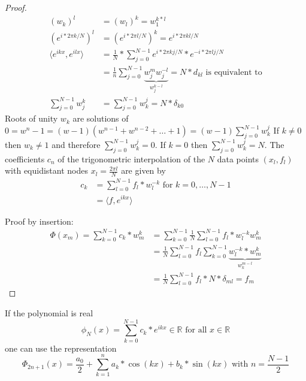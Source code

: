 \begin{proof}
    \begin{align*}
    (w_k)
        ^l &= (w_l)^k = w_1^{k*l}\\
        \left( e^{i*2 \pi k / N} \right)^l &= \left( e^{i*2 \pi l / N} \right)^k = e^{i*2 \pi kl / N}\\
        \langle e^{ikx}, e^{ilx} \rangle &= \frac{1}{N} * \sum_{j=0}^{N-1} e^{i*2 \pi k j / N} * e^{-i*2 \pi l j / N}\\
        &= \frac{1}{n} \sum_{j=0}^{N-1} \underbrace{w_j^m w_j^{-l}}_{w_j^{k-l}} = N * d_{kl} \text{ is equivalent to}\\
        \sum_{j=0}^{N-1}w_j^k &= \sum_{j=0}^{N-1} w_k^{j} = N * \delta_{k0}
    \end{align*}
    Roots of unity $w_k$ are solutions of $0 = w^n-1 = (w-1)(w^{n-1}+w^{n-2}+\ldots+1) = (w-1) \sum_{j=0}^{N-1} w_k^j$
    If $k \neq 0$ then $w_k \neq 1$ and therefore $\sum_{j=0}^{N-1} w_k^j = 0$.
    If $k=0$ then $\sum_{j=0}^{N-1} w_k^j = N$.
    The coefficients $c_n$ of the trigonometric interpolation of the $N$ data points $(x_l, f_l)$ with equidistant nodes $x_l = \frac{2 \pi l}{N}$ are given by
    \begin{align*}
        c_k &= \sum_{l=0}^{N-1} f_l * w_l^{-k} \text{ for } k = 0, \ldots, N-1\\
        &= \langle f, e^{ikx} \rangle
    \end{align*}

    Proof by insertion:
    \begin{align*}
        \Phi(x_m)=\sum_{k=0}^{N-1} c_k *w_m^k &= \sum_{k=0}^{N-1} \frac{1}{N} \sum_{l=0}^{N-1} f_l * w_l^{-k} w_m^k\\
        &= \frac{1}{N} \sum_{l=0}^{N-1} f_l \sum_{k=0}^{N-1} \underbrace{w_l^{-k}*w_m^k}_{w_k^{m-l}}\\
        &= \frac{1}{N} \sum_{l=0}^{N-1} f_l * N * \delta_{ml} = f_m
    \end{align*}
\end{proof}
\begin{remark}
    If the polynomial is real
    \begin{equation*}
        \phi_N(x) = \sum_{k=0}^{N-1}c_{k}*e^{ikx} \in \mathbb{R} \text{ for all } x \in \mathbb{R}
    \end{equation*}
    one can use the representation
    \begin{equation*}
        \Phi_{2n+1}(x) = \frac{a_0}{2}+\sum_{k=1}^{n} a_k * \cos(kx) + b_k * \sin(kx) \text{ with } n = \frac{N-1}{2}
    \end{equation*}
\end{remark}

